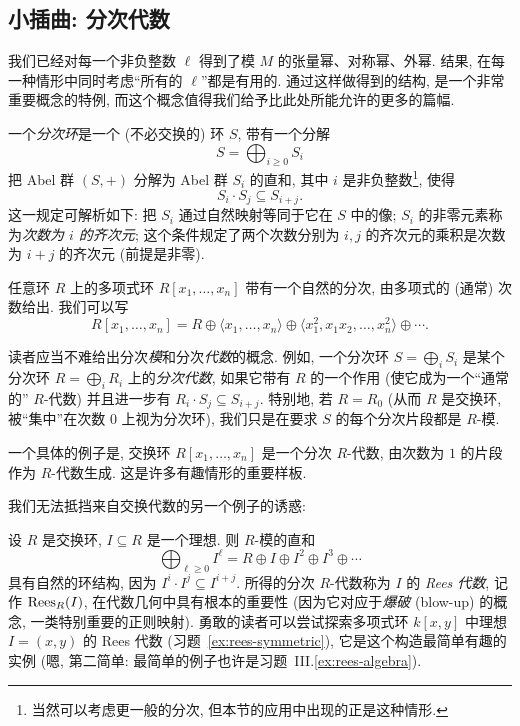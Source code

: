 \subsection{小插曲: 分次代数}
\label{subsec:graded-algebra}

我们已经对每一个非负整数 $\ell$ 得到了模 $M$ 的张量幂、对称幂、外幂. 结果, 在每一种情形中同时考虑``所有的 $\ell$''都是有用的. 通过这样做得到的结构, 是一个非常重要概念的特例, 而这个概念值得我们给予比此处所能允许的更多的篇幅.

一个\emph{分次环}是一个 (不必交换的) 环 $S$, 带有一个分解
\[
S=\bigoplus_{i\ge0}S_i
\]
把 Abel 群 $(S,+)$ 分解为 Abel 群 $S_i$ 的直和, 其中 $i$ 是非负整数\footnote{当然可以考虑更一般的分次, 但本节的应用中出现的正是这种情形.}, 使得
\[
S_i\cdot S_j\subseteq S_{i+j}.
\]
这一规定可解析如下: 把 $S_i$ 通过自然映射等同于它在 $S$ 中的像; $S_i$ 的非零元素称为\emph{次数为 $i$ 的齐次元}; 这个条件规定了两个次数分别为 $i,j$ 的齐次元的乘积是次数为 $i+j$ 的齐次元 (前提是非零).

\begin{example}\label{ex:poly-graded}
任意环 $R$ 上的多项式环 $R[x_1,\dots,x_n]$ 带有一个自然的分次, 由多项式的 (通常) 次数给出. 我们可以写
\[
R[x_1,\dots,x_n]=R\oplus\langle x_1,\dots,x_n\rangle\oplus\langle x_1^2,x_1x_2,\dots,x_n^2\rangle\oplus\cdots.
\]
\end{example}

读者应当不难给出分次\emph{模}和分次\emph{代数}的概念. 例如, 一个分次环 $S=\bigoplus_i S_i$ 是某个分次环 $R=\bigoplus_i R_i$ 上的\emph{分次代数}, 如果它带有 $R$ 的一个作用 (使它成为一个``通常的'' $R$-代数) 并且进一步有 $R_i\cdot S_j\subseteq S_{i+j}$. 特别地, 若 $R=R_0$ (从而 $R$ 是交换环, 被``集中''在次数 $0$ 上视为分次环), 我们只是在要求 $S$ 的每个分次片段都是 $R$-模.

一个具体的例子是, 交换环 $R[x_1,\dots,x_n]$ 是一个分次 $R$-代数, 由次数为 $1$ 的片段作为 $R$-代数生成. 这是许多有趣情形的重要样板.

我们无法抵挡来自交换代数的另一个例子的诱惑:

\begin{example}\label{ex:rees-algebra-graded}
设 $R$ 是交换环, $I\subseteq R$ 是一个理想. 则 $R$-模的直和
\[
\bigoplus_{\ell\ge0}I^\ell=R\oplus I\oplus I^2\oplus I^3\oplus\cdots
\]
具有自然的环结构, 因为 $I^i\cdot I^j\subseteq I^{i+j}$. 所得的分次 $R$-代数称为 $I$ 的 \emph{Rees 代数}, 记作 $\operatorname{Rees}_R(I)$, 在代数几何中具有根本的重要性 (因为它对应于\emph{爆破} (blow-up) 的概念, 一类特别重要的正则映射). 勇敢的读者可以尝试探索多项式环 $k[x,y]$ 中理想 $I=(x,y)$ 的 Rees 代数 (习题~\ref{ex:rees-symmetric}), 它是这个构造最简单有趣的实例 (嗯, 第二简单: 最简单的例子也许是习题~III.\ref{ex:rees-algebra}).
\end{example}

